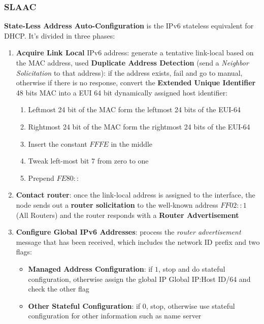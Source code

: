 \subsubsection{SLAAC}
\textbf{State-Less Address Auto-Configuration} is the IPv6 stateless equivalent for DHCP. It's divided in three phases:
\begin{enumerate}
	\item \textbf{Acquire Link Local} IPv6 address: generate a tentative link-local based on the MAC address, used \textbf{Duplicate Address Detection} (send a \textit{Neighbor Solicitation} to that address): if the address exists, fail and go to manual, otherwise if there is no response, convert the \textbf{Extended Unique Identifier} 48 bits MAC into a EUI 64 bit dynamically assigned host identifier:
	\begin{enumerate}
		\item Leftmost 24 bit of the MAC form the leftmost 24 bits of the EUI-64
		\item Rightmost 24 bit of the MAC form the rightmost 24 bits of the EUI-64
		\item Insert the constant $FFFE$ in the middle
		\item Tweak left-most bit 7 from zero to one
		\item Prepend $FE80::$
	\end{enumerate}
	\item \textbf{Contact router}: once the link-local address is assigned to the interface, the node sends out a \textbf{router solicitation} to the well-known address $FF02::1$ (All Routers) and the router responds with a \textbf{Router Advertisement}
	\item \textbf{Configure Global IPv6 Addresses}: process the \textit{router advertisement} message that has been received, which includes the network ID prefix and two flags:
	\begin{itemize}
		\item \textbf{Managed Address Configuration}: if $1$, stop and do stateful configuration, otherwise assign the global IP Global IP:Host ID/64 and check the other flag
		\item \textbf{Other Stateful Configuration}: if $0$, stop, otherwise use stateful configuration for other information such as name server
	\end{itemize}
\end{enumerate}